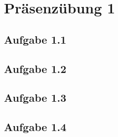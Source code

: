 
\section{Präsenzübung 1}
\subsection{Aufgabe 1.1}

\subsection{Aufgabe 1.2}

\subsection{Aufgabe 1.3}


\subsection{Aufgabe 1.4}

